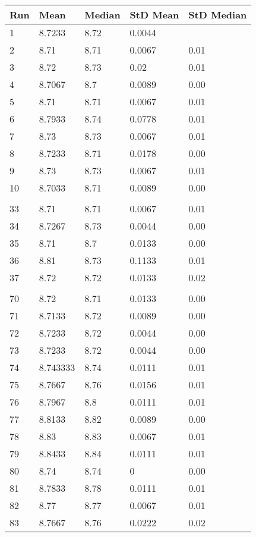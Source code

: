 
\begin{tabular}{lllll}

{\bf Run} & {\bf Mean} & {\bf Median} & 
  {\bf StD Mean} & {\bf StD Median} \\ \hline

1 & 8.7233 & 8.72 & 0.0044   \\
2 & 8.71 & 8.71 & 0.0067 & 0.01   \\
3 & 8.72 & 8.73 & 0.02 & 0.01   \\
4 & 8.7067 & 8.7 & 0.0089 & 0.00   \\
5 & 8.71 & 8.71 & 0.0067 & 0.01   \\
6 & 8.7933 & 8.74 & 0.0778 & 0.01   \\
7 & 8.73 & 8.73 & 0.0067 & 0.01   \\
8 & 8.7233 & 8.71 & 0.0178 & 0.00   \\
9 & 8.73 & 8.73 & 0.0067 & 0.01   \\
10 & 8.7033 & 8.71 & 0.0089 & 0.00   \\
\\
33 & 8.71 & 8.71 & 0.0067 & 0.01   \\
34 & 8.7267 & 8.73 & 0.0044 & 0.00   \\
35 & 8.71 & 8.7 & 0.0133 & 0.00   \\
36 & 8.81 & 8.73 & 0.1133 & 0.01   \\
37 & 8.72 & 8.72 & 0.0133 & 0.02   \\
\\
70 & 8.72 & 8.71 & 0.0133 & 0.00   \\
71 & 8.7133 & 8.72 & 0.0089 & 0.00   \\
72 & 8.7233 & 8.72 & 0.0044 & 0.00   \\
73 & 8.7233 & 8.72 & 0.0044 & 0.00   \\
74 & 8.743333 & 8.74 & 0.0111 & 0.01   \\
75 & 8.7667 & 8.76 & 0.0156 & 0.01   \\
76 & 8.7967 & 8.8 & 0.0111 & 0.01   \\
77 & 8.8133 & 8.82 & 0.0089 & 0.00   \\
78 & 8.83 & 8.83 & 0.0067 & 0.01   \\
79 & 8.8433 & 8.84 & 0.0111 & 0.01   \\
80 & 8.74 & 8.74 & 0 & 0.00   \\
81 & 8.7833 & 8.78 & 0.0111 & 0.01   \\
82 & 8.77 & 8.77 & 0.0067 & 0.01   \\
83 & 8.7667 & 8.76 & 0.0222 & 0.02   \\

\end{tabular}
